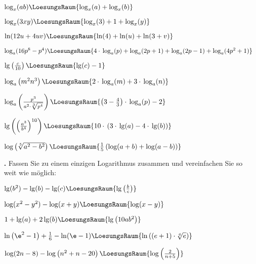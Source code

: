 \begin{bbwAufgabenBlock}
\item $\log_x(ab)  \LoesungsRaum{\log_x(a) + \log_x(b)}$
\item $\log_x(3xy)  \LoesungsRaum{\log_x(3) + 1 + \log_x(y)}$
\item $\ln(12u+4uv)  \LoesungsRaum{\ln(4) + \ln(u) + \ln(3+v)}$
\item $\log_a(16p^8-p^4) \LoesungsRaum{4\cdot{}\log_a(p)+ \log_a(2p+1) + \log_a(2p-1)+ \log_a(4p^2+1)}$
\noTRAINER{\newpage}

\item $\lg\left(\frac{c}{10}\right)  \LoesungsRaum{\lg(c) - 1}$
\item $\log_a\left( m^2n^3 \right)  \LoesungsRaum{2\cdot{}\log_a(m) + 3\cdot{}\log_a(n)}$
\item $\log_a\left( \frac{p^3}{a^2 \cdot{} \sqrt[3]{p^4}} \right)  \LoesungsRaum{\left(3-\frac43\right)\cdot{}\log_a(p)- 2}$
\item
$\lg\left(\left(\frac{a^3}{b^4}\right)^{10}\right)  \LoesungsRaum{10\cdot{}\left(3 \cdot{}\lg(a) - 4\cdot{} \lg(b)\right)}$
\noTRAINER{\newpage}

\item $\log \left( \sqrt[5]{a^2-b^2}\right)  \LoesungsRaum{\frac15\left(\log(a+b) + \log(a-b)\right)}$

\end{bbwAufgabenBlock}

\newpage


\textbf{\bbwAufgabenNummer{}.}
Fassen Sie zu einem einzigen Logarithmus zusammen und vereinfachen Sie
so weit wie möglich:

\begin{bbwAufgabenBlock}
\item $\lg(b^2) - \lg(b) - \lg(c) \LoesungsRaum{\lg\left(\frac{b}c\right)}$
\item $\log(x^2-y^2) - \log(x+y) \LoesungsRaum{\log(x-y)}$
\item $1+\lg(a)+2\lg(b)  \LoesungsRaum{\lg\left( 10ab^2 \right)}$
\item $\ln\left(\e^2-1\right) + \frac16 - \ln(\e-1) \LoesungsRaum{\ln\left((e+1)\cdot{}\sqrt[6]{e}\right)}$
\item $\log(2n-8) - \log\left(n^2+n-20\right) \LoesungsRaum{\log\left(\frac{2}{n+5}\right)}$

\end{bbwAufgabenBlock}



\platzFuerBerechnungenBisEndeSeite{}%
%
